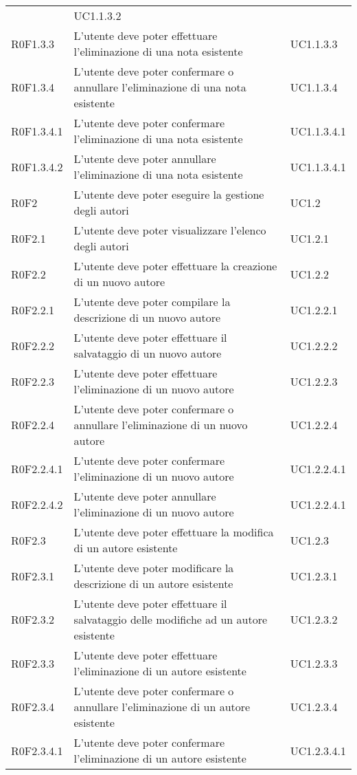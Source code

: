 \begin{longtable}{lp{}l}
& UC1.1.3.2 \\
R0F1.3.3
& L'utente deve poter effettuare l'eliminazione di una nota esistente
& UC1.1.3.3 \\
R0F1.3.4
& L'utente deve poter confermare o annullare l'eliminazione di una nota esistente
& UC1.1.3.4 \\
R0F1.3.4.1
& L'utente deve poter confermare l'eliminazione di una nota esistente
& UC1.1.3.4.1 \\
R0F1.3.4.2
& L'utente deve poter annullare l'eliminazione di una nota esistente
& UC1.1.3.4.1 \\
R0F2
& L'utente deve poter eseguire la gestione degli autori
& UC1.2 \\
R0F2.1
& L'utente deve poter visualizzare l'elenco degli autori
& UC1.2.1 \\
R0F2.2
& L'utente deve poter effettuare la creazione di un nuovo autore
& UC1.2.2 \\
R0F2.2.1
& L'utente deve poter compilare la descrizione di un nuovo autore
& UC1.2.2.1 \\
R0F2.2.2
& L'utente deve poter effettuare il salvataggio di un nuovo autore
& UC1.2.2.2 \\
R0F2.2.3
& L'utente deve poter effettuare l'eliminazione di un nuovo autore
& UC1.2.2.3 \\
R0F2.2.4
& L'utente deve poter confermare o annullare l'eliminazione di un nuovo autore
& UC1.2.2.4 \\
R0F2.2.4.1
& L'utente deve poter confermare l'eliminazione di un nuovo autore
& UC1.2.2.4.1 \\
R0F2.2.4.2
& L'utente deve poter annullare l'eliminazione di un nuovo autore
& UC1.2.2.4.1 \\
R0F2.3
& L'utente deve poter effettuare la modifica di un autore esistente
& UC1.2.3 \\
R0F2.3.1
& L'utente deve poter modificare la descrizione di un autore esistente
& UC1.2.3.1 \\
R0F2.3.2
& L'utente deve poter effettuare il salvataggio delle modifiche ad un autore esistente
& UC1.2.3.2 \\
R0F2.3.3
& L'utente deve poter effettuare l'eliminazione di un autore esistente
& UC1.2.3.3 \\
R0F2.3.4
& L'utente deve poter confermare o annullare l'eliminazione di un autore esistente
& UC1.2.3.4 \\
R0F2.3.4.1
& L'utente deve poter confermare l'eliminazione di un autore esistente
& UC1.2.3.4.1 \\

\end{longtable}
